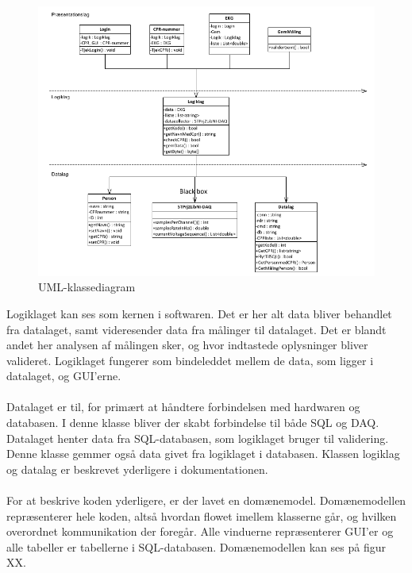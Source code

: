 \begin{figure}[H]
	\centering
	\includegraphics[width=1\textwidth]{Figurer/Snip20150512_9}
	\caption{UML-klassediagram}
\end{figure}
 
Logiklaget kan ses som kernen i softwaren. Det er her alt data bliver behandlet fra datalaget, samt videresender data fra målinger til datalaget. Det er blandt andet her analysen af målingen sker, og hvor indtastede oplysninger bliver valideret. Logiklaget fungerer som bindeleddet mellem de data, som ligger i datalaget, og GUI’erne. \\ \\
Datalaget er til, for primært at håndtere forbindelsen med hardwaren og databasen. I denne klasse bliver der skabt forbindelse til både SQL og DAQ. Datalaget henter data fra SQL-databasen, som logiklaget bruger til validering. Denne klasse gemmer også data givet fra logiklaget i databasen. Klassen logiklag og datalag er beskrevet yderligere i dokumentationen. \\ \\
For at beskrive koden yderligere, er der lavet en domænemodel. Domænemodellen repræsenterer hele koden, altså hvordan flowet imellem klasserne går, og hvilken overordnet kommunikation der foregår. Alle vinduerne repræsenterer GUI’er og alle tabeller er tabellerne i SQL-databasen. Domænemodellen kan ses på figur XX. 

